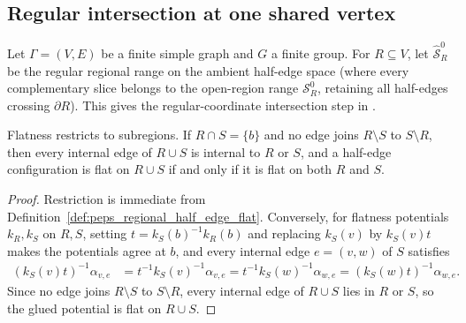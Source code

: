 \subsection{Regular intersection at one shared vertex}

Let $\Gamma=(V,E)$ be a finite simple graph and $G$ a finite group.
For $R\subseteq V$, let $\widehat{\mathcal S}_R^0$ be the regular
regional range on the ambient half-edge space (where every complementary
slice belongs to the open-region range $\mathcal S_R^0$, retaining all
half-edges crossing $\partial R$). This gives the regular-coordinate
intersection step in \cite[Theorem~5.4]{Schuch2010PEPS}.

\begin{lemma}%
    \label{thm:peps_regular_flat_union}
    \leanok
    Flatness restricts to subregions. If $R\cap S=\{b\}$ and no edge
    joins $R\setminus S$ to $S\setminus R$, then every internal edge of
    $R\cup S$ is internal to $R$ or $S$, and a half-edge configuration is
    flat on $R\cup S$ if and only if it is flat on both $R$ and $S$.
\end{lemma}
\begin{proof}\leanok
    Restriction is immediate from Definition~\ref{def:peps_regional_half_edge_flat}.
    Conversely, for flatness potentials $k_R,k_S$ on $R,S$, setting
    $t=k_S(b)^{-1}k_R(b)$ and replacing $k_S(v)$ by $k_S(v)t$ makes
    the potentials agree at $b$, and every internal edge $e=(v,w)$ of $S$
    satisfies
    \begin{align}
        (k_S(v)t)^{-1}\alpha_{v,e}
         & =t^{-1}k_S(v)^{-1}\alpha_{v,e}
        =t^{-1}k_S(w)^{-1}\alpha_{w,e}
        =(k_S(w)t)^{-1}\alpha_{w,e}.
        \label{eq:peps_flat_potential_gluing}
    \end{align}
    Since no edge joins $R\setminus S$ to $S\setminus R$, every internal
    edge of $R\cup S$ lies in $R$ or $S$, so the glued potential is flat
    on $R\cup S$.
\end{proof}

